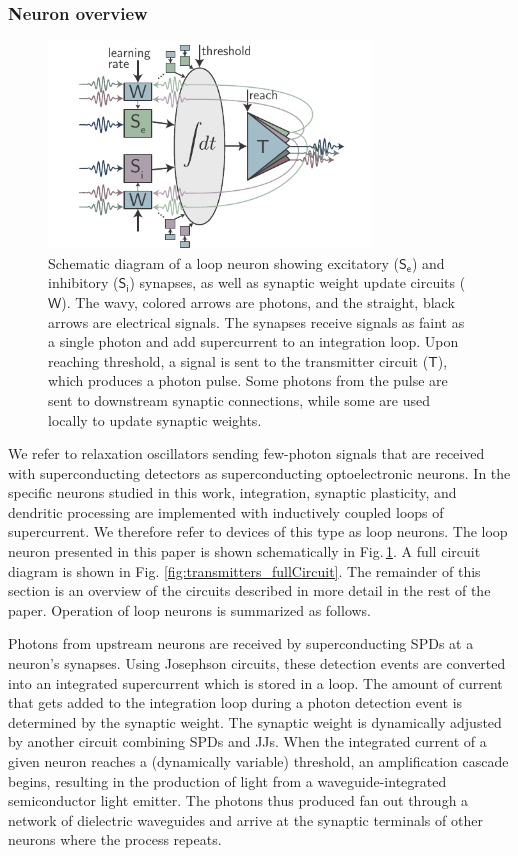 \documentclass[twocolumn]{article}
\begin{document}
\subsubsection{\label{sec:neuronOverview}Neuron overview}
\begin{figure}[t!]
	\centerline{\includegraphics[width=8.6cm]{_general_schematic_small.pdf}}
	\caption{\label{fig:general_schematic}Schematic diagram of a loop neuron showing excitatory ($\mathsf{S_e}$) and inhibitory ($\mathsf{S_i}$) synapses, as well as synaptic weight update circuits ($\mathsf{W}$). The wavy, colored arrows are photons, and the straight, black arrows are electrical signals. The synapses receive signals as faint as a single photon and add supercurrent to an integration loop. Upon reaching threshold, a signal is sent to the transmitter circuit ($\mathsf{T}$), which produces a photon pulse. Some photons from the pulse are sent to downstream synaptic connections, while some are used locally to update synaptic weights.}
\end{figure}
We refer to relaxation oscillators sending few-photon signals that are received with superconducting detectors as superconducting optoelectronic neurons. In the specific neurons studied in this work, integration, synaptic plasticity, and dendritic processing are implemented with inductively coupled loops of supercurrent. We therefore refer to devices of this type as loop neurons. The loop neuron presented in this paper is shown schematically in Fig.\,\ref{fig:general_schematic}. A full circuit diagram is shown in Fig. \ref{fig:transmitters_fullCircuit}. The remainder of this section is an overview of the circuits described in more detail in the rest of the paper. Operation of loop neurons is summarized as follows. 

Photons from upstream neurons are received by superconducting SPDs at a neuron's synapses. Using Josephson circuits, these detection events are converted into an integrated supercurrent which is stored in a loop. The amount of current that gets added to the integration loop during a photon detection event is determined by the synaptic weight. The synaptic weight is dynamically adjusted by another circuit combining SPDs and JJs. When the integrated current of a given neuron reaches a (dynamically variable) threshold, an amplification cascade begins, resulting in the production of light from a waveguide-integrated semiconductor light emitter. The photons thus produced fan out through a network of dielectric waveguides and arrive at the synaptic terminals of other neurons where the process repeats.
\end{document}

